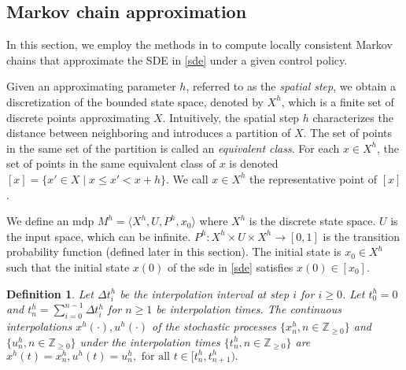 \documentclass[letterpaper, 10 pt, conference]{ieeeconf}
\newtheorem{definition}{Definition}
\newcommand{\bbZ}{\mathbb{Z}_{\ge 0}}
\begin{document}
\subsection{Markov chain approximation}
In this section, we employ the methods in \cite{kushner2001numerical}
to compute locally consistent Markov chains that approximate the SDE
in \eqref{sde} under a given control policy.





































Given an approximating parameter $h$, referred to as the \emph{spatial
  step}, we obtain a discretization of the bounded state space,
denoted by $X^h$, which is a finite set of discrete points
approximating $X$. Intuitively, the spatial step $h$ characterizes the
distance between neighboring and introduces a partition of $X$. The
set of points in the same set of the partition is called an
\emph{equivalent class}.  For each $x\in X^h$, the set of points in
the same equivalent class of $x$ is denoted
$[x]=\{x'\in X\mid x \le x'< x+h\} $.  We call $x\in X^h$ the
representative point of $[x]$. 




We define an \ac{mdp} $M^h = \langle X^h , U, P^h, x_0 \rangle$ where
$X^h$ is the discrete state space. $U$ is the input space, which can
be infinite.  $P^h: X^h \times U \times X^h \rightarrow [0,1]$ is the
transition probability function (defined later in this section).  The
initial state is $x_0\in X^h$ such that the initial state $x(0)$ of
the \ac{sde} in \eqref{sde} satisfies $x(0)\in [x_0]$.

\begin{definition} \cite{kushner2001numerical} Let $\Delta t_i^h$ be
  the interpolation interval at step $i$ for $i \ge 0$. Let $t_0^h=0$
  and $t_n^h= \sum_{i=0}^{n-1} \Delta t^h_i$ for $n\ge 1$ be
  interpolation times.  The \emph{continuous interpolations}
  $x^h(\cdot), u^h(\cdot)$ of the stochastic processes
  $\{x^h_n, n \in \bbZ \}$ and $\{u_n^h, n \in \bbZ\}$ under the
  interpolation times $\{ t_n^h, n \in \bbZ \}$ are
  $x^h(t) = x_n^h, u^h(t) = u_n^h, \text{ for all } t \in [t_n^h,
  t_{n+1}^{h}).$
\end{definition}
\end{document}
